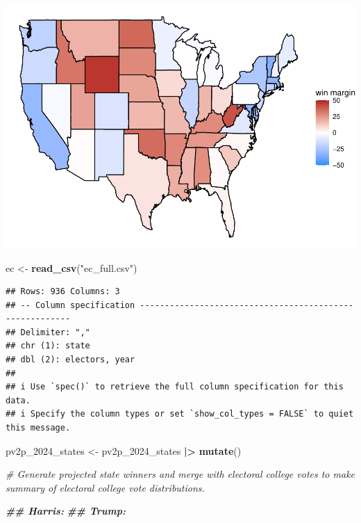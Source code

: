 \documentclass[
]{article}
\newenvironment{Shaded}{\begin{snugshade}}{\end{snugshade}}
\newcommand{\CommentTok}[1]{\textcolor[rgb]{0.56,0.35,0.01}{\textit{#1}}}
\newcommand{\DocumentationTok}[1]{\textcolor[rgb]{0.56,0.35,0.01}{\textbf{\textit{#1}}}}
\newcommand{\FunctionTok}[1]{\textcolor[rgb]{0.13,0.29,0.53}{\textbf{#1}}}
\newcommand{\NormalTok}[1]{#1}
\newcommand{\OtherTok}[1]{\textcolor[rgb]{0.56,0.35,0.01}{#1}}
\newcommand{\SpecialCharTok}[1]{\textcolor[rgb]{0.81,0.36,0.00}{\textbf{#1}}}
\newcommand{\StringTok}[1]{\textcolor[rgb]{0.31,0.60,0.02}{#1}}
\begin{document}
\includegraphics{Lab1-notes_files/figure-latex/unnamed-chunk-3-1.pdf}

\begin{Shaded}
\begin{Highlighting}[]
\NormalTok{ec }\OtherTok{\textless{}{-}}  \FunctionTok{read\_csv}\NormalTok{(}\StringTok{"ec\_full.csv"}\NormalTok{)}
\end{Highlighting}
\end{Shaded}

\begin{verbatim}
## Rows: 936 Columns: 3
## -- Column specification --------------------------------------------------------
## Delimiter: ","
## chr (1): state
## dbl (2): electors, year
## 
## i Use `spec()` to retrieve the full column specification for this data.
## i Specify the column types or set `show_col_types = FALSE` to quiet this message.
\end{verbatim}

\begin{Shaded}
\begin{Highlighting}[]
\NormalTok{pv2p\_2024\_states }\OtherTok{\textless{}{-}}\NormalTok{ pv2p\_2024\_states }\SpecialCharTok{|\textgreater{}}
  \FunctionTok{mutate}\NormalTok{()}

\CommentTok{\# Generate projected state winners and merge with electoral college votes to make summary of electoral college vote distributions. }


\DocumentationTok{\#\# Harris: }
\DocumentationTok{\#\# Trump: }
\end{Highlighting}
\end{Shaded}
\end{document}
